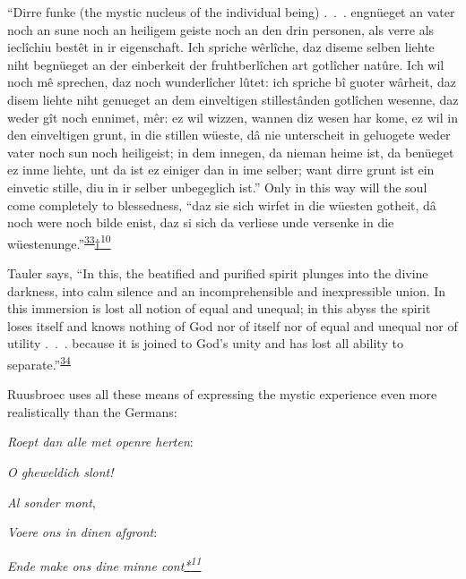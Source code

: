 ``Dirre funke (the mystic nucleus of the individual being) .~.~.
engnüeget an vater noch an sune noch an heiligem geiste noch an den drin
personen, als verre als ieclîchiu bestêt in ir eigenschaft. Ich spriche
wêrlîche, daz diseme selben liehte niht begnüeget an der einberkeit der
fruhtberlîchen art gotlîcher natûre. Ich wil noch mê sprechen, daz noch
wunderlîcher lûtet: ich spriche bî guoter wârheit, daz disem liehte niht
genueget an dem einveltigen stillestânden gotlîchen wesenne, daz weder
gît noch ennimet, mêr: ez wil wizzen, wannen diz wesen har kome, ez wil
in den einveltigen grunt, in die stillen wüeste, dâ nie unterscheit in
geluogete weder vater noch sun noch heiligeist; in dem innegen, da
nieman heime ist, da benüeget ez inme liehte, unt da ist ez einiger dan
in ime selber; want dirre grunt ist ein einvetic stille, diu in ir
selber unbegeglich ist.'' Only in this way will the soul come completely
to blessedness, ``daz sie sich wirfet in die wüesten gotheit, dâ noch
were noch bilde enist, daz si sich da verliese unde versenke in die
wüestenunge.''\textsuperscript{\protect\hypertarget{17_Chapter_Ten__THE_FAILURE_OF_IMAG.xhtmlux5cux23id_670}{\protect\hyperlink{23_NOTES.xhtmlux5cux23id_671}{33}}}\protect\hypertarget{17_Chapter_Ten__THE_FAILURE_OF_IMAG.xhtmlux5cux23id_2597}{\protect\hyperlink{23_NOTES.xhtmlux5cux23id_2598}{†\textsuperscript{10}}}

Tauler says, ``In this, the beatified and purified spirit plunges into
the divine darkness, into calm silence and an incomprehensible
\protect\hypertarget{17_Chapter_Ten__THE_FAILURE_OF_IMAG.xhtmlux5cux23page_260}{}{}and
inexpressible union. In this immersion is lost all notion of equal and
unequal; in this abyss the spirit loses itself and knows nothing of God
nor of itself nor of equal and unequal nor of utility .~.~. because it
is joined to God's unity and has lost all ability to
separate.''\textsuperscript{\protect\hypertarget{17_Chapter_Ten__THE_FAILURE_OF_IMAG.xhtmlux5cux23id_669}{\protect\hyperlink{23_NOTES.xhtmlux5cux23page_428}{34}}}

Ruusbroec uses all these means of expressing the mystic experience even
more realistically than the Germans:

\emph{Roept dan alle met openre herten}:

\emph{O gheweldich slont!}

\emph{Al sonder mont},

\emph{Voere ons in dinen afgront}:

\emph{Ende make ons dine minne
cont\protect\hypertarget{17_Chapter_Ten__THE_FAILURE_OF_IMAG.xhtmlux5cux23id_2599}{\protect\hyperlink{23_NOTES.xhtmlux5cux23id_2600}{*\textsuperscript{11}}}}

